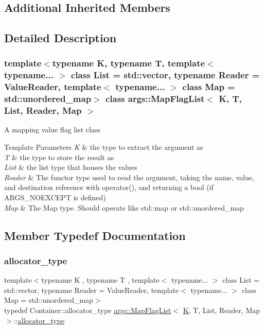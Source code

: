 \subsection*{Additional Inherited Members}


\subsection{Detailed Description}
\subsubsection*{template$<$typename K, typename T, template$<$ typename... $>$ class List = std\+::vector, typename Reader = Value\+Reader, template$<$ typename... $>$ class Map = std\+::unordered\+\_\+map$>$\newline
class args\+::\+Map\+Flag\+List$<$ K, T, List, Reader, Map $>$}

A mapping value flag list class


\begin{DoxyTemplParams}{Template Parameters}
{\em K} & the type to extract the argument as \\
\hline
{\em T} & the type to store the result as \\
\hline
{\em List} & the list type that houses the values \\
\hline
{\em Reader} & The functor type used to read the argument, taking the name, value, and destination reference with operator(), and returning a bool (if A\+R\+G\+S\+\_\+\+N\+O\+E\+X\+C\+E\+PT is defined) \\
\hline
{\em Map} & The Map type. Should operate like std\+::map or std\+::unordered\+\_\+map \\
\hline
\end{DoxyTemplParams}


\subsection{Member Typedef Documentation}
\mbox{\label{classargs_1_1_map_flag_list_a4f098b2b16c4c3ffc86a4e7bcef62068}} 
\subsubsection{\texorpdfstring{allocator\+\_\+type}{allocator\_type}}
{\footnotesize\ttfamily template$<$typename K , typename T , template$<$ typename... $>$ class List = std\+::vector, typename Reader  = Value\+Reader, template$<$ typename... $>$ class Map = std\+::unordered\+\_\+map$>$ \\
typedef Container\+::allocator\+\_\+type \hyperlink{classargs_1_1_map_flag_list}{args\+::\+Map\+Flag\+List}$<$ \hyperlink{cgal__test_8cpp_a891e241aa245ae63618f03737efba309}{K}, T, List, Reader, Map $>$\+::\hyperlink{classargs_1_1_map_flag_list_a4f098b2b16c4c3ffc86a4e7bcef62068}{allocator\+\_\+type}}

